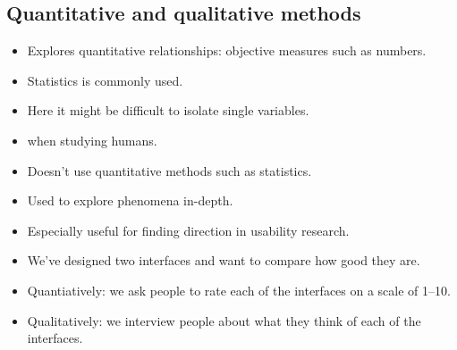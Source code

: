 \subsection{Quantitative and qualitative methods}

\begin{frame}
  \begin{definition}
    \begin{itemize}
      \item Explores quantitative relationships: objective measures such as 
        numbers.
      \item Statistics is commonly used.
      \item Here it might be difficult to isolate single variables.
      \item \Eg when studying humans.
    \end{itemize}
  \end{definition}

  \begin{definition}
    \begin{itemize}
      \item Doesn't use quantitative methods such as statistics.
      \item Used to explore phenomena in-depth.
      \item Especially useful for finding direction in usability research.
    \end{itemize}
  \end{definition}
\end{frame}

\begin{frame}
  \begin{example}
    \begin{itemize}
      \item We've designed two interfaces and want to compare how good they 
        are.
      \item Quantiatively: we ask people to rate each of the interfaces on a 
        scale of 1--10.
      \item Qualitatively: we interview people about what they think of each of 
        the interfaces.
    \end{itemize}
  \end{example}
\end{frame}

